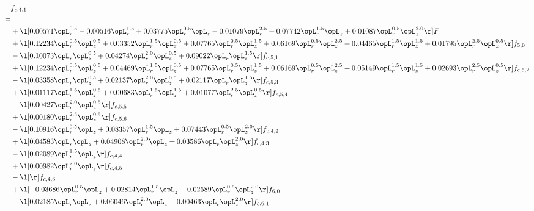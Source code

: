 \begin{alignat}{2} 
\label{eq:f_41_2} 
& f_{c,4,1} \nonumber \\ 
 = \\ 
& + \l[  0.00571 \opL_r^{0.5}   -0.00516 \opL_r^{1.5} +  0.03775 \opL_r^{0.5} \opL_z   -0.01079 \opL_r^{2.5} +  0.07742 \opL_r^{1.5} \opL_z +  0.01087 \opL_r^{0.5} \opL_z^{2.0}  \r] F \nonumber \\ 
& + \l[  0.12234 \opL_r^{0.5} \opL_z^{0.5} +  0.03352 \opL_r^{1.5} \opL_z^{0.5} +  0.07765 \opL_r^{0.5} \opL_z^{1.5} +  0.06169 \opL_r^{0.5} \opL_z^{2.5} +  0.04465 \opL_r^{1.5} \opL_z^{1.5} +  0.01795 \opL_r^{2.5} \opL_z^{0.5}  \r] f_{5,0} \nonumber \\ 
& - \l[  0.10073 \opL_r \opL_z^{0.5} +  0.04274 \opL_r^{2.0} \opL_z^{0.5} +  0.09022 \opL_r \opL_z^{1.5}  \r] f_{c,5,1} \nonumber \\ 
& + \l[  0.12234 \opL_r^{0.5} \opL_z^{0.5} +  0.04469 \opL_r^{1.5} \opL_z^{0.5} +  0.07765 \opL_r^{0.5} \opL_z^{1.5} +  0.06169 \opL_r^{0.5} \opL_z^{2.5} +  0.05149 \opL_r^{1.5} \opL_z^{1.5} +  0.02693 \opL_r^{2.5} \opL_z^{0.5}  \r] f_{c,5,2} \nonumber \\ 
& - \l[  0.03358 \opL_r \opL_z^{0.5} +  0.02137 \opL_r^{2.0} \opL_z^{0.5} +  0.02117 \opL_r \opL_z^{1.5}  \r] f_{c,5,3} \nonumber \\ 
& + \l[  0.01117 \opL_r^{1.5} \opL_z^{0.5} +  0.00683 \opL_r^{1.5} \opL_z^{1.5} +  0.01077 \opL_r^{2.5} \opL_z^{0.5}  \r] f_{c,5,4} \nonumber \\ 
& - \l[  0.00427 \opL_r^{2.0} \opL_z^{0.5}  \r] f_{c,5,5} \nonumber \\ 
& + \l[  0.00180 \opL_r^{2.5} \opL_z^{0.5}  \r] f_{c,5,6} \nonumber \\ 
& - \l[  0.10916 \opL_r^{0.5} \opL_z +  0.08357 \opL_r^{1.5} \opL_z +  0.07443 \opL_r^{0.5} \opL_z^{2.0}  \r] f_{c,4,2} \nonumber \\ 
& + \l[  0.04583 \opL_r \opL_z +  0.04908 \opL_r^{2.0} \opL_z +  0.03586 \opL_r \opL_z^{2.0}  \r] f_{c,4,3} \nonumber \\ 
& - \l[  0.02089 \opL_r^{1.5} \opL_z  \r] f_{c,4,4} \nonumber \\ 
& + \l[  0.00982 \opL_r^{2.0} \opL_z  \r] f_{c,4,5} \nonumber \\ 
& - \l[  \r] f_{c,4,6} \nonumber \\ 
& + \l[  -0.03686 \opL_r^{0.5} \opL_z +  0.02814 \opL_r^{1.5} \opL_z   -0.02589 \opL_r^{0.5} \opL_z^{2.0}  \r] f_{6,0} \nonumber \\ 
& - \l[  0.02185 \opL_r \opL_z +  0.06046 \opL_r^{2.0} \opL_z +  0.00463 \opL_r \opL_z^{2.0}  \r] f_{c,6,1} \nonumber \\ 

\end{alignat}
